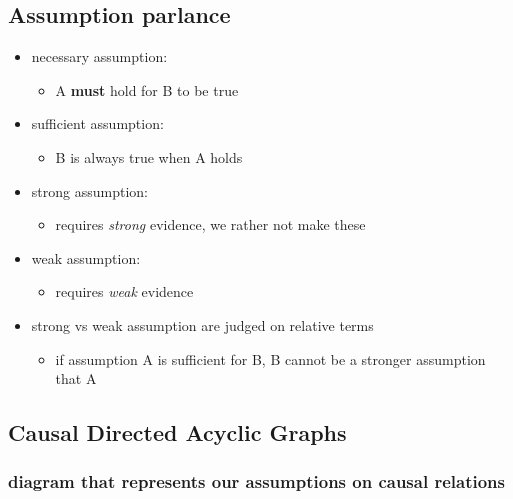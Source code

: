 \documentclass[
  letterpaper,
  DIV=11,
  numbers=noendperiod]{scrartcl}
\providecommand{\tightlist}{%
  \setlength{\itemsep}{0pt}\setlength{\parskip}{0pt}}\usepackage{longtable,booktabs,array}
\begin{document}
\subsection{Assumption parlance}\label{sec-assumptions}

\begin{itemize}
\tightlist
\item
  necessary assumption:

  \begin{itemize}
  \tightlist
  \item
    A \textbf{must} hold for B to be true
  \end{itemize}
\item
  sufficient assumption:

  \begin{itemize}
  \tightlist
  \item
    B is always true when A holds
  \end{itemize}
\item
  strong assumption:

  \begin{itemize}
  \tightlist
  \item
    requires \emph{strong} evidence, we rather not make these
  \end{itemize}
\item
  weak assumption:

  \begin{itemize}
  \tightlist
  \item
    requires \emph{weak} evidence
  \end{itemize}
\item
  strong vs weak assumption are judged on relative terms

  \begin{itemize}
  \tightlist
  \item
    if assumption A is sufficient for B, B cannot be a stronger
    assumption that A
  \end{itemize}
\end{itemize}

\subsection{Causal Directed Acyclic
Graphs}\label{causal-directed-acyclic-graphs}

\subsubsection{diagram that represents our assumptions on causal
relations}\label{diagram-that-represents-our-assumptions-on-causal-relations}
\end{document}
